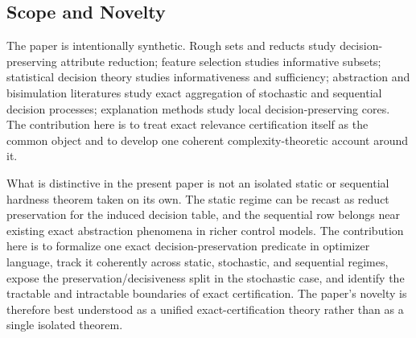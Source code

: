 \subsection{Scope and Novelty}

The paper is intentionally synthetic. Rough sets and reducts study decision-preserving attribute reduction; feature selection studies informative subsets; statistical decision theory studies informativeness and sufficiency; abstraction and bisimulation literatures study exact aggregation of stochastic and sequential decision processes; explanation methods study local decision-preserving cores. The contribution here is to treat exact relevance certification itself as the common object and to develop one coherent complexity-theoretic account around it.

What is distinctive in the present paper is not an isolated static or sequential hardness theorem taken on its own. The static regime can be recast as reduct preservation for the induced decision table, and the sequential row belongs near existing exact abstraction phenomena in richer control models. The contribution here is to formalize one exact decision-preservation predicate in optimizer language, track it coherently across static, stochastic, and sequential regimes, expose the preservation/decisiveness split in the stochastic case, and identify the tractable and intractable boundaries of exact certification. The paper's novelty is therefore best understood as a unified exact-certification theory rather than as a single isolated theorem.

